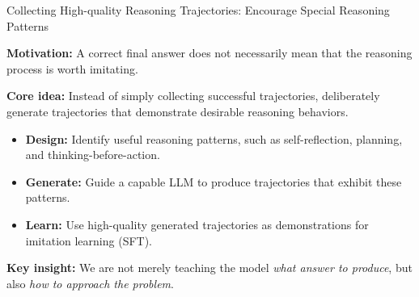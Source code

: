 \documentclass[aspectratio=169]{beamer}
\begin{document}
\begin{frame}{Collecting High-quality Reasoning Trajectories: Encourage Special Reasoning Patterns}

\textbf{Motivation:} A correct final answer does not necessarily mean that the reasoning process is worth imitating.

\vspace{0.3cm}

\textbf{Core idea:} Instead of simply collecting successful trajectories, deliberately generate trajectories that demonstrate desirable reasoning behaviors.

\begin{itemize}
    \item \textbf{Design:} Identify useful reasoning patterns, such as self-reflection, planning, and thinking-before-action.

    \item \textbf{Generate:} Guide a capable LLM to produce trajectories that exhibit these patterns.

    \item \textbf{Learn:} Use high-quality generated trajectories as demonstrations for imitation learning (SFT).
\end{itemize}

\vspace{0.3cm}

\textbf{Key insight:} We are not merely teaching the model \textit{what answer to produce}, but also \textit{how to approach the problem}.

\end{frame}
\end{document}
